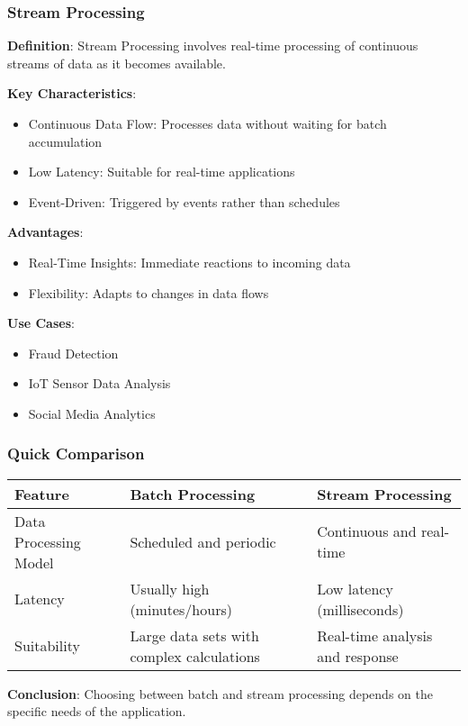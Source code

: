 \documentclass[aspectratio=169]{beamer}
\begin{document}
\begin{frame}[fragile]
    \frametitle{Stream Processing}
    \textbf{Definition}: Stream Processing involves real-time processing of continuous streams of data as it becomes available.
    
    \textbf{Key Characteristics}:
    \begin{itemize}
        \item Continuous Data Flow: Processes data without waiting for batch accumulation
        \item Low Latency: Suitable for real-time applications
        \item Event-Driven: Triggered by events rather than schedules
    \end{itemize}
    
    \textbf{Advantages}:
    \begin{itemize}
        \item Real-Time Insights: Immediate reactions to incoming data
        \item Flexibility: Adapts to changes in data flows
    \end{itemize}
    
    \textbf{Use Cases}:
    \begin{itemize}
        \item Fraud Detection
        \item IoT Sensor Data Analysis
        \item Social Media Analytics
    \end{itemize}
\end{frame}

\begin{frame}[fragile]
    \frametitle{Quick Comparison}
    \begin{center}
        \begin{tabular}{|l|l|l|}
            \hline
            \textbf{Feature}            & \textbf{Batch Processing}                       & \textbf{Stream Processing}                  \\
            \hline
            Data Processing Model       & Scheduled and periodic                         & Continuous and real-time                    \\
            \hline
            Latency                     & Usually high (minutes/hours)                  & Low latency (milliseconds)                  \\
            \hline
            Suitability                 & Large data sets with complex calculations      & Real-time analysis and response             \\
            \hline
        \end{tabular}
    \end{center}

    \textbf{Conclusion}: Choosing between batch and stream processing depends on the specific needs of the application.
\end{frame}
\end{document}
